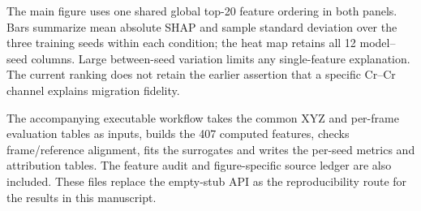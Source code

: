 \documentclass[pdflatex,sn-mathphys-num]{sn-jnl}
\begin{document}
\begin{table}[htbp]
\centering\small
\caption{\textbf{Current error-surrogate fidelity diagnostic.} Means and sample standard deviations over the three underlying MLIP training seeds. Each value summarizes the separate five-fold diagnostic estimator on the common 267-frame sample. The MAE unit is meV atom$^{-1}$, rather than the total-energy eV unit used in the superseded 150-frame analysis. These values do not quantify an independent-trajectory generalization error for the final TreeSHAP estimator.}
\label{tab:current_shap_fidelity}

\end{table}

The main figure uses one shared global top-20 feature ordering in both panels. Bars summarize mean absolute SHAP and sample standard deviation over the three training seeds within each condition; the heat map retains all 12 model--seed columns. Large between-seed variation limits any single-feature explanation. The current ranking does not retain the earlier assertion that a specific Cr--Cr channel explains migration fidelity.

The accompanying executable workflow takes the common XYZ and per-frame evaluation tables as inputs, builds the 407 computed features, checks frame/reference alignment, fits the surrogates and writes the per-seed metrics and attribution tables. The feature audit and figure-specific source ledger are also included. These files replace the empty-stub API as the reproducibility route for the results in this manuscript.
\FloatBarrier


\FloatBarrier

\end{document}
